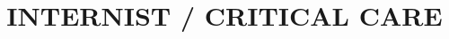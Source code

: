\documentclass[11pt,letter,sans]{moderncv}
\title{INTERNIST / CRITICAL CARE}               %
\begin{document}
\maketitle
%

\closesection
\emptysection
\newpage


\end{document}
